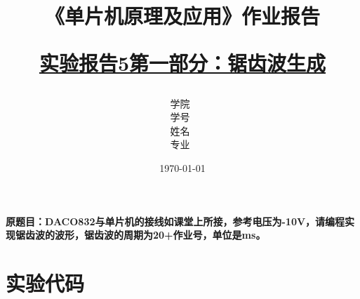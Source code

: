 \documentclass[12pt,hyperref,a4paper,UTF8]{ctexart}
\title{ 
        \vspace{1cm}
        \heiti \Huge \textbf{《单片机原理及应用》作业报告} \par
        \vspace{1cm} 
        \heiti \Large {\underline{实验报告5第一部分：锯齿波生成}   } 
        \vspace{3cm}
    
    }
\author{
        \vspace{0.5cm}
        \kaishu\Large 学院\ \dlmu[9cm]{卓越学院} \\ %
        \vspace{0.5cm}
        \kaishu\Large 学号\ \dlmu[9cm]{23040447} \\ %
        \vspace{0.5cm}
        \kaishu\Large 姓名\ \dlmu[9cm]{陈文轩} \qquad  \\ %
        \vspace{0.5cm}
        \kaishu\Large 专业\ \dlmu[9cm]{智能硬件与系统(电子信息工程)} \qquad \\ %
    }
\date{\today} %
\begin{document}
\cover
\thispagestyle{empty} %







\newpage
\setcounter{page}{1} %



\textbf{原题目：DACO832与单片机的接线如课堂上所接，参考电压为-10V，请编程实现锯齿波的波形，锯齿波的周期为20+作业号，单位是ms。}


\section{实验代码}
\end{document}
